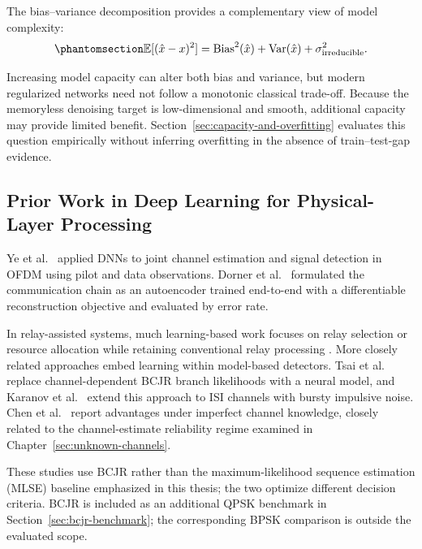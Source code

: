 The bias--variance decomposition provides a complementary view of model complexity:
\begin{equation}\protect\phantomsection\label{eq:bias-variance-decomp}
\mathbb{E}[(\hat{x}-x)^2]
=
\text{Bias}^2(\hat{x})
+
\text{Var}(\hat{x})
+
\sigma^2_{\text{irreducible}} .
\end{equation}

Increasing model capacity can alter both bias and variance, but modern regularized networks need not follow a monotonic classical trade-off. Because the memoryless denoising target is low-dimensional and smooth, additional capacity may provide limited benefit. Section~\ref{sec:capacity-and-overfitting} evaluates this question empirically without inferring overfitting in the absence of train--test-gap evidence.

\subsection{Prior Work in Deep Learning for Physical-Layer Processing}\label{sec:prior-work-in-deep-learning-for-physical-layer-processing}

Ye et al.~\cite{YeLiJuang2018OFDMDL} applied DNNs to joint channel estimation and signal detection in OFDM using pilot and data observations. Dorner et al.~\cite{Dorner2018OverTheAirDL} formulated the communication chain as an autoencoder trained end-to-end with a differentiable reconstruction objective and evaluated by error rate.

In relay-assisted systems, much learning-based work focuses on relay selection or resource allocation while retaining conventional relay processing \cite{Akdemir2024DLRelaySelection}. More closely related approaches embed learning within model-based detectors. Tsai et al.~\cite{TsaiTeng2020BCJRNet} replace channel-dependent BCJR branch likelihoods with a neural model, and Karanov et al.~\cite{Karanov2024BurstyISI} extend this approach to ISI channels with bursty impulsive noise. Chen et al.~\cite{Chen2024BCJRNetRobustness} report advantages under imperfect channel knowledge, closely related to the channel-estimate reliability regime examined in Chapter~\ref{sec:unknown-channels}.

These studies use BCJR rather than the maximum-likelihood sequence estimation (MLSE) baseline emphasized in this thesis; the two optimize different decision criteria. BCJR is included as an additional QPSK benchmark in Section~\ref{sec:bcjr-benchmark}; the corresponding BPSK comparison is outside the evaluated scope.

